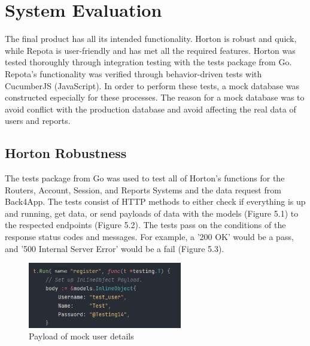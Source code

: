 \chapter{System Evaluation}
The final product has all its intended functionality. Horton is robust and quick, while Repota is user-friendly and has met all the required features. Horton was tested thoroughly through integration testing with the tests package from Go. Repota's functionality was verified through behavior-driven tests with CucumberJS (JavaScript). In order to perform these tests, a mock database was constructed especially for these processes. The reason for a mock database was to avoid conflict with the production database and avoid affecting the real data of users and reports.

\section{Horton Robustness}
The tests package from Go was used to test all of Horton's functions for the Routers, Account, Session, and Reports Systems and the data request from Back4App. The tests consist of HTTP methods to either check if everything is up and running, get data, or send payloads of data with the models (Figure 5.1) to the respected endpoints (Figure 5.2). The tests pass on the conditions of the response status codes and messages. For example, a '200 OK' would be a pass, and '500 Internal Server Error' would be a fail (Figure 5.3).

\begin{figure}[H]
    \centering
    \caption{Payload of mock user details}
    \label{image:registertest}
    \includegraphics[width=0.6\textwidth]{images/horton/tests/register_test_payload.png}
\end{figure}


